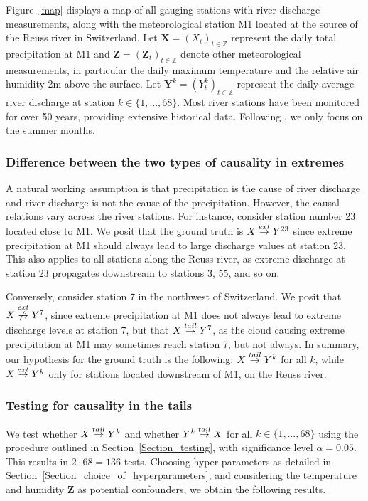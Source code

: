 \documentclass[a4paper,11pt]{article}
\newcommand{\toverset}[2]{\overset{{\rm #1}}{#2}}
\begin{document}
Figure~\ref{map} displays a map of all gauging stations with river discharge measurements, along with the meteorological station M1 located at the source of the Reuss river in Switzerland. Let $\textbf{X} = (X_t)_{t\in\mathbb{Z}}$ represent the daily total precipitation at M1 and $\textbf{Z} = (\textbf{Z}_t)_{t\in\mathbb{Z}}$ denote other meteorological measurements, in particular the daily maximum temperature and the relative air humidity 2m above the surface. Let $\textbf{Y}^k = (Y_t^k)_{t\in\mathbb{Z}}$ represent the daily average river discharge at station $k\in\{1, \dots, 68\}$. Most river stations have been monitored for over 50 years, providing extensive historical data. Following \cite{Pasche}, we only focus on the summer months. 

\subsubsection{Difference between the two types of causality in extremes}
A natural working assumption is that precipitation is the cause of river discharge and river discharge is not the cause of the precipitation. However, the causal relations vary across the river stations. For instance, consider station number 23 located close to M1. We posit that the ground truth is $\textbf{X}\toverset{ext}{\to}\textbf{Y}^{23}$ since extreme precipitation at M1 should always lead to large discharge values at station 23. This also applies to all stations along the Reuss river, as extreme discharge at station 23 propagates downstream to stations 3, 55, and so on.

Conversely, consider station 7 in the northwest of Switzerland. We posit that $\textbf{X}\toverset{ext}{\not\to}\textbf{Y}^{7}$, since extreme precipitation at M1 {does not always} lead to extreme discharge levels at station 7, but that $\textbf{X}\toverset{tail}{\to}\textbf{Y}^{7}$, as the cloud causing extreme precipitation at M1 may sometimes reach station 7, but not always. 
In summary, our hypothesis for the ground truth is the following: $\textbf{X}\toverset{tail}{\to}\textbf{Y}^{k}$ for all $k$, while $\textbf{X}\toverset{ext}{\to}\textbf{Y}^{k}$ only for stations located downstream of M1, on the Reuss river.


\subsubsection{Testing for causality in the tails}

We test whether $\textbf{X}\toverset{tail}{\to}\textbf{Y}^{k}$ and whether $\textbf{Y}^k\toverset{tail}{\to}\textbf{X}$ for all $k\in\{1, \dots, 68\}$ using the procedure outlined in Section~\ref{Section_testing}, with significance level $\alpha = 0.05$. This results in $2\cdot68 = 136$ tests. 
Choosing hyper-parameters as detailed in Section~\ref{Section_choice_of_hyperparameters}, and considering the temperature and humidity $\textbf{Z}$ as potential confounders, we obtain the following results.
\end{document}
